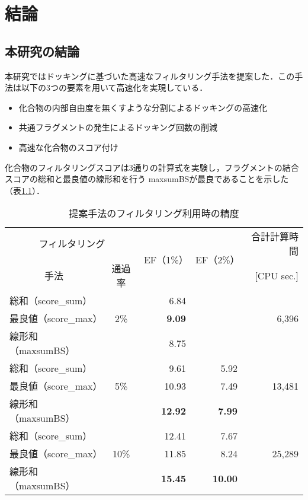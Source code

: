 \chapter{結論}
\section{本研究の結論}\label{sec:conclusion}
本研究ではドッキングに基づいた高速なフィルタリング手法を提案した．この手法は以下の3つの要素を用いて高速化を実現している．
\begin{itemize}
\item 化合物の内部自由度を無くすような分割によるドッキングの高速化
\item 共通フラグメントの発生によるドッキング回数の削減
\item 高速な化合物のスコア付け
\end{itemize}

化合物のフィルタリングスコアは3通りの計算式を実験し，フラグメントの結合スコアの総和と最良値の線形和を行う
maxsumBSが最良であることを示した（表\ref{table:conclusion_1}）．
\begin{table}[htb] \centering
	\caption{提案手法のフィルタリング利用時の精度}
	\label{table:conclusion_1}
	\begin{tabular}{lc|rr|r}
	\hline
	\multicolumn{2}{c|}{フィルタリング}	&\multirow{2}{*}{EF（1\%）}	&\multirow{2}{*}{EF（2\%）}	&合計計算時間	\\
	\multicolumn{1}{c}{手法}	&通過率	&								&									&[CPU sec.]		\\ \hline
	総和（score\_sum）			&			&6.84							&\textendash					&					\\
	最良値（score\_max）		&2\%		&\textbf{9.09}				&\textendash					&6,396			\\
	線形和（maxsumBS）		&			&8.75							&\textendash					&					\\ \hline
	総和（score\_sum）			&			&9.61							&5.92								&					\\
	最良値（score\_max）		&5\%		&10.93						&7.49								&13,481			\\
	線形和（maxsumBS）		&			&\textbf{12.92}				&\textbf{7.99}					&					\\ \hline
	総和（score\_sum）			&			&12.41						&7.67								&					\\
	最良値（score\_max）		&10\%		&11.85						&8.24								&25,289			\\
	線形和（maxsumBS）		&			&\textbf{15.45}				&\textbf{10.00}					&					\\ \hline
	\end{tabular}
\end{table}

